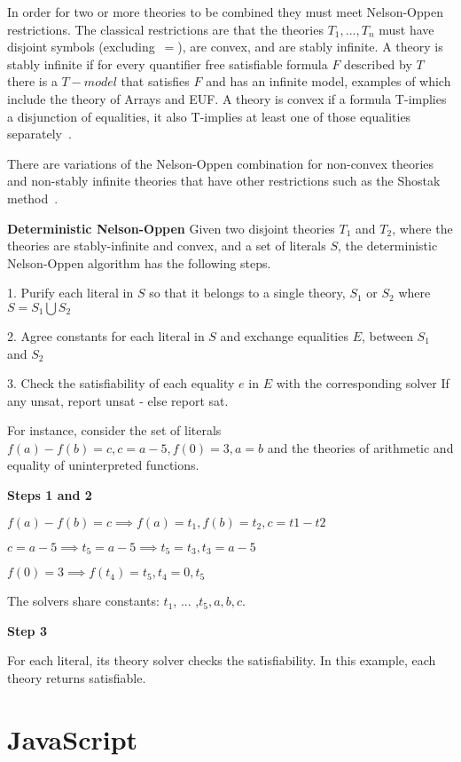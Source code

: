 \documentclass[]{final_report}
\begin{document}
In order for two or more theories to be combined they must meet Nelson-Oppen restrictions. The classical restrictions are that the theories $T_1, ..., T_n$ must have disjoint symbols (excluding~$=$), are convex, and are stably infinite. A theory is stably infinite if for every quantifier free satisfiable formula $F$ described by $T$ there is a $T-model$ that satisfies $F$ and has an infinite model, examples of which include the theory of Arrays and EUF. A theory is convex if a formula T-implies a disjunction of equalities, it also T-implies at least one of those equalities separately~\cite{Torlak}.

There are variations of the Nelson-Oppen combination for non-convex theories and non-stably infinite theories that have other restrictions such as the Shostak method~\cite{manna2003combining}.

\textbf{Deterministic Nelson-Oppen}
Given two disjoint theories $T_1$ and $T_2$, where the theories are stably-infinite and convex, and a set of literals $S$, the deterministic Nelson-Oppen algorithm has the following steps.

1. Purify each literal in $S$ so that it belongs to a single theory, $S_1$ or $S_2$ where $S = S_1 \bigcup S_2$

2. Agree constants for each literal in $S$ and exchange equalities $E$, between $S_1$ and $S_2$

3. Check the satisfiability of each equality $e$ in $E$ with the corresponding solver If any unsat, report unsat - else report sat.

For instance, consider the set of literals $f(a) - f(b) = c, c = a -5, f(0) = 3, a = b$ and the theories of arithmetic and equality of uninterpreted functions.

\textbf{Steps 1 and 2}

$f(a) - f(b) = c \implies f(a) = t_1, f(b) = t_2, c = t1 - t2$

$c = a - 5 \implies t_5 = a - 5 \implies t_5 = t_3, t_3 = a- 5$

$f(0) =3 \implies f(t_4) = t_5, t_4 = 0, t_5$

The solvers share constants: $t_1$, ... ,$t_5, a, b, c$.

\textbf{Step 3}

For each literal, its theory solver checks the satisfiability. In this example, each theory returns satisfiable.

\chapter{JavaScript}
\end{document}
